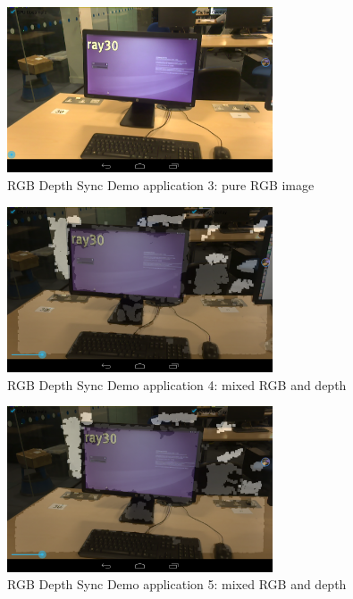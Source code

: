 \documentclass[12pt,twoside]{article}
\begin{document}
\begin{figure}[h]
    \centering
    \includegraphics[width=0.7\textwidth]{figures/rgbd3}
    \caption{RGB Depth Sync Demo application 3: pure RGB image}
    \label{fig: rgbd3}
\end{figure}

\begin{figure}[h]
    \centering
    \includegraphics[width=0.7\textwidth]{figures/rgbd4}
    \caption{RGB Depth Sync Demo application 4: mixed RGB and depth}
    \label{fig: rgbd4}
\end{figure}

\begin{figure}[h]
    \centering
    \includegraphics[width=0.7\textwidth]{figures/rgbd5}
    \caption{RGB Depth Sync Demo application 5: mixed RGB and depth}
    \label{fig: rgbd5}
\end{figure}
\end{document}
